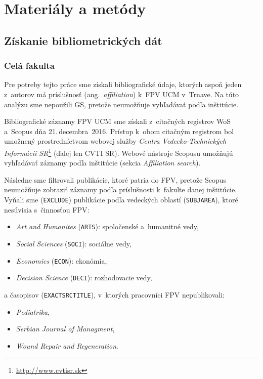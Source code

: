 \chapter{Materiály a metódy}
\label{chap:methods}

\section{Získanie bibliometrických dát}

\subsection{Celá fakulta}
\label{sec.all.mining}

Pre potreby tejto práce sme získali bibliografické údaje, ktorých aspoň jeden
z~autorov má príslušnosť (ang.~\emph{affiliation}) k~FPV UCM v~Trnave.  Na túto
analýzu sme nepoužili GS, pretože neumožňuje vyhľadávať podľa inštitúcie.

Bibliografické záznamy FPV UCM sme získali z~citačných registrov WoS a~Scopus
dňa 21.\,decembra~2016.  Prístup k~obom citačným registrom bol umožnený
prostredníctvom webovej služby \emph{Centra Vedecko-Technických Informácií
  SR}\footnote{\url{http://www.cvtisr.sk}} (ďalej len CVTI SR).  Webové nástroje
Scopusu umožňujú vyhľadávať záznamy podľa inštitúcie (sekcia \emph{Affiliation
  search}).

Následne sme filtrovali publikácie, ktoré patria do FPV, pretože Scopus
neumožňuje zobraziť záznamy podľa príslušnosti k~fakulte danej inštitúcie.
Vyňali sme (\texttt{EXCLUDE}) publikácie podľa vedeckých oblastí
(\texttt{SUBJAREA}), ktoré nesúvisia s~činnosťou FPV:

\begin{itemize}
\item \emph{Art and Humanites} (\texttt{ARTS}): spoločenské a~humanitné vedy,
\item \emph{Social Sciences} (\texttt{SOCI}): sociálne vedy,
\item \emph{Economics} (\texttt{ECON}): ekonómia,
\item \emph{Decision Science} (\texttt{DECI}): rozhodovacie vedy,
\end{itemize}
a časopisov (\texttt{EXACTSRCTITLE}), v~ktorých pracovníci FPV nepublikovali:

\begin{itemize}
\item \emph{Pediatrika},
\item \emph{Serbian Journal of Managment},
\item \emph{Wound Repair and Regeneration}.
\end{itemize}

